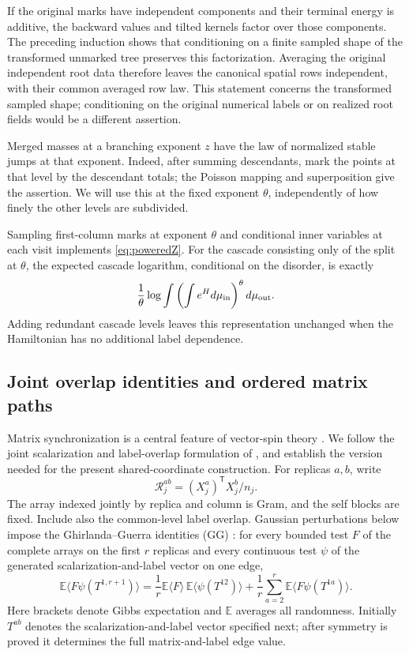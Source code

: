 \documentclass[11pt]{article}
\numberwithin{equation}{section}
\theoremstyle{definition}
\newcommand{\E}{\mathbb E}
\begin{document}
If the original marks have independent components and their terminal energy is additive, the backward values and tilted kernels factor over those components. The preceding induction shows that conditioning on a finite sampled shape of the transformed unmarked tree preserves this factorization. Averaging the original independent root data therefore leaves the canonical spatial rows independent, with their common averaged row law. This statement concerns the transformed sampled shape; conditioning on the original numerical labels or on realized root fields would be a different assertion.

Merged masses at a branching exponent $z$ have the law of normalized stable jumps at that exponent. Indeed, after summing descendants, mark the points at that level by the descendant totals; the Poisson mapping and superposition give the assertion. We will use this at the fixed exponent $\theta$, independently of how finely the other levels are subdivided.

Sampling first-column marks at exponent $\theta$ and conditional inner variables at each visit implements \eqref{eq:poweredZ}. For the cascade consisting only of the split at $\theta$, the expected cascade logarithm, conditional on the disorder, is exactly
\[
\frac1\theta\log\int\left(\int e^H d\mu_{\rm in}\right)^\theta d\mu_{\rm out}.
\]
Adding redundant cascade levels leaves this representation unchanged when the Hamiltonian has no additional label dependence.

\subsection{Joint overlap identities and ordered matrix paths}
Matrix synchronization is a central feature of vector-spin theory \cite{PanVector}. We follow the joint scalarization and label-overlap formulation of \cite[Proposition~5.2]{Mourrat2023}, and establish the version needed for the present shared-coordinate construction.
For replicas $a,b$, write
\[
\mathcal R_j^{ab}=(X_j^a)^{\mathsf T}X_j^b/n_j.
\]
The array indexed jointly by replica and column is Gram, and the self blocks are fixed. Include also the common-level label overlap. Gaussian perturbations below impose the Ghirlanda--Guerra identities (GG) \cite{GhirlandaGuerra1998}: for every bounded test $F$ of the complete arrays on the first $r$ replicas and every continuous test $\psi$ of the generated scalarization-and-label vector on one edge,
\begin{equation}\label{eq:GG}
\E\langle F\psi(T^{1,r+1})\rangle
=\frac1r\E\langle F\rangle\,\E\langle\psi(T^{12})\rangle
+\frac1r\sum_{a=2}^r\E\langle F\psi(T^{1a})\rangle.
\end{equation}
Here brackets denote Gibbs expectation and $\E$ averages all randomness. Initially $T^{ab}$ denotes the scalarization-and-label vector specified next; after symmetry is proved it determines the full matrix-and-label edge value.
\end{document}
